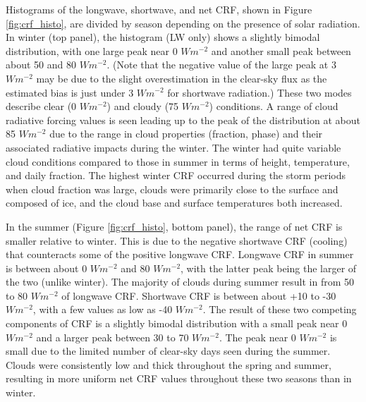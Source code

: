 Histograms of the longwave, shortwave, and net CRF, shown in Figure \ref{fig:crf_histo}, are divided by season depending on the presence of solar radiation. In winter (top panel), the histogram (LW only) shows a slightly bimodal distribution, with one large peak near 0 $W m^{-2}$ and another small peak between about 50 and 80 $W m^{-2}$. (Note that the negative value of the large peak at 3 $W m^{-2}$ may be due to the slight overestimation in the clear-sky flux as the estimated bias is just under 3 $Wm^{-2}$ for shortwave radiation.) These two modes describe clear (0 $W m^{-2}$) and cloudy (75 $W m^{-2}$) conditions. A range of cloud radiative forcing values is seen leading up to the peak of the distribution at about 85 $W m^{-2}$ due to the range in cloud properties (fraction, phase) and their associated radiative impacts during the winter. The winter had quite variable cloud conditions compared to those in summer in terms of height, temperature, and daily fraction. The highest winter CRF occurred during the storm periods when cloud fraction was large, clouds were primarily close to the surface and composed of ice, and the cloud base and surface temperatures both increased.  

In the summer (Figure \ref{fig:crf_histo}, bottom panel), the range of net CRF is smaller relative to winter. This is due to the negative shortwave CRF (cooling) that counteracts some of the positive longwave CRF. Longwave CRF in summer is between about 0 $Wm^{-2}$ and 80 $Wm^{-2}$, with the latter peak being the larger of the two (unlike winter). The majority of clouds during summer result in from 50 to 80 $Wm^{-2}$ of longwave CRF. Shortwave CRF is between about +10 to -30 $Wm^{-2}$, with a few values as low as -40 $Wm^{-2}$. The result of these two competing components of CRF is a slightly bimodal distribution with a small peak near 0 $Wm^{-2}$ and a larger peak between 30 to 70 $Wm^{-2}$. The peak near 0 $Wm^{-2}$ is small due to the limited number of clear-sky days seen during the summer. Clouds were consistently low and thick throughout the spring and summer, resulting in more uniform net CRF values throughout these two seasons than in winter.

